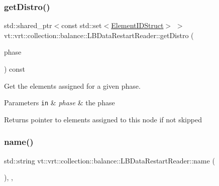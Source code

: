 \subsubsection{\texorpdfstring{get\+Distro()}{getDistro()}}
{\footnotesize\ttfamily std\+::shared\+\_\+ptr$<$const std\+::set$<$\hyperlink{namespacevt_1_1vrt_1_1collection_1_1balance_a9f5b53fafb270212279a4757d2c4cd28}{Element\+I\+D\+Struct}$>$ $>$ vt\+::vrt\+::collection\+::balance\+::\+L\+B\+Data\+Restart\+Reader\+::get\+Distro (\begin{DoxyParamCaption}\item[{\hyperlink{namespacevt_a46ce6733d5cdbd735d561b7b4029f6d7}{Phase\+Type}}]{phase }\end{DoxyParamCaption}) const\hspace{0.3cm}{\ttfamily [inline]}}



Get the elements assigned for a given phase. 


\begin{DoxyParams}[1]{Parameters}
\mbox{\tt in}  & {\em phase} & the phase\\
\hline
\end{DoxyParams}
\begin{DoxyReturn}{Returns}
pointer to elements assigned to this node if not skipped 
\end{DoxyReturn}
\mbox{\label{structvt_1_1vrt_1_1collection_1_1balance_1_1_l_b_data_restart_reader_a2d715003c589c23a80346e4f84443fc4}} 
\subsubsection{\texorpdfstring{name()}{name()}}
{\footnotesize\ttfamily std\+::string vt\+::vrt\+::collection\+::balance\+::\+L\+B\+Data\+Restart\+Reader\+::name (\begin{DoxyParamCaption}{ }\end{DoxyParamCaption})\hspace{0.3cm}{\ttfamily [inline]}, {\ttfamily [override]}, {\ttfamily [virtual]}}



